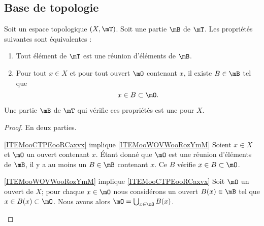 \subsection{Base de topologie}

\begin{propositionDef}  \label{DEFooLEHPooIlNmpi}
	Soit un espace topologique \( (X,\mT)\). Soit une partie \( \mB\) de \( \mT\). Les propriétés suivantes sont équivalentes :
	\begin{enumerate}
		\item\label{ITEMooCTPEooRCaxvx}
		      Tout élément de \( \mT\) est une réunion d'éléments de \( \mB\).
		\item       \label{ITEMooWOVWooRozYmM}
		      Pour tout \( x\in X\) et pour tout ouvert \( \mO\) contenant \( x\), il existe \( B\in \mB\) tel que
		      \begin{equation}
			      x\in B\subset \mO.
		      \end{equation}
	\end{enumerate}
	Une partie \( \mB\) de \( \mT\) qui vérifie ces propriétés est une  pour \( X\).
\end{propositionDef}

\begin{proof}
	En deux parties.
	\begin{subproof}
		\item[\ref{ITEMooCTPEooRCaxvx} implique \ref{ITEMooWOVWooRozYmM}]
		Soient \( x\in X\) et \( \mO\) un ouvert contenant \( x\). Étant donné que \( \mO\) est une réunion d'éléments de \( \mB\), il y a au moins un \( B\in \mB\) contenant \( x\). Ce \( B\) vérifie \( x\in B\subset \mO\).
		\item[\ref{ITEMooWOVWooRozYmM} implique \ref{ITEMooCTPEooRCaxvx}]
		Soit \( \mO\) un ouvert de \( X\); pour chaque \( x\in\mO\) nous considérons un ouvert \( B(x)\in \mB\) tel que \( x\in B(x)\subset\mO\). Nous avons alors \( \mO=\bigcup_{x\in \mO}B(x)\).
	\end{subproof}
\end{proof}

